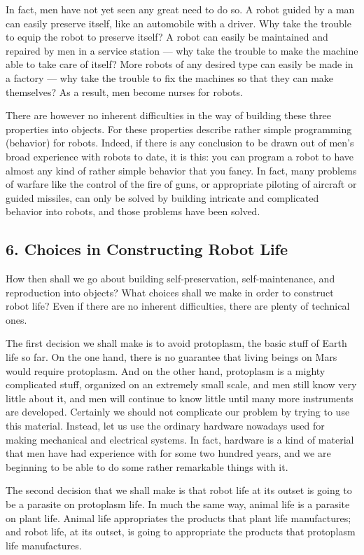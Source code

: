 \documentclass[11pt]{article}
\begin{document}
In fact, men have not yet seen any great need to do so. A robot guided by a man
can easily preserve itself, like an automobile with a driver. Why take the
trouble to equip the robot to preserve itself? A robot can easily be maintained
and repaired by men in a service station --- why take the trouble to make the
machine able to take care of itself? More robots of any desired type can easily
be made in a factory --- why take the trouble to fix the machines so that they
can make themselves? As a result, men become nurses for robots.

There are however no inherent difficulties in the way of building these three
properties into objects. For these properties describe rather simple
programming (behavior) for robots. Indeed, if there is any conclusion to be
drawn out of men's broad experience with robots to date, it is this: you can
program a robot to have almost any kind of rather simple behavior that you
fancy. In fact, many problems of warfare like the control of the fire of guns,
or appropriate piloting of aircraft or guided missiles, can only be solved by
building intricate and complicated behavior into robots, and those problems
have been solved.

\subsection*{6. Choices in Constructing Robot Life}

How then shall we go about building self-preservation, self-maintenance, and
reproduction into objects? What choices shall we make in order to construct
robot life? Even if there are no inherent difficulties, there are plenty of
technical ones.

The first decision we shall make is to avoid protoplasm, the basic stuff of
Earth life so far. On the one hand, there is no guarantee that living beings on
Mars would require protoplasm. And on the other hand, protoplasm is a mighty
complicated stuff, organized on an extremely small scale, and men still know
very little about it, and men will continue to know little until many more
instruments are developed. Certainly we should not complicate our problem by
trying to use this material. Instead, let us use the ordinary hardware nowadays
used for making mechanical and electrical systems. In fact, hardware is a kind
of material that men have had experience with for some two hundred years, and
we are beginning to be able to do some rather remarkable things with it.

The second decision that we shall make is that robot life at its outset is
going to be a parasite on protoplasm life. In much the same way, animal life is
a parasite on plant life. Animal life appropriates the products that plant life
manufactures; and robot life, at its outset, is going to appropriate the
products that protoplasm life manufactures.
\end{document}
